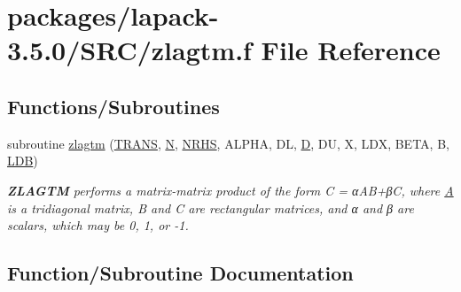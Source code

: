 \hypertarget{zlagtm_8f}{}\section{packages/lapack-\/3.5.0/\+S\+R\+C/zlagtm.f File Reference}
\label{zlagtm_8f}
\subsection*{Functions/\+Subroutines}
\begin{DoxyCompactItemize}
\item 
subroutine \hyperlink{zlagtm_8f_ae43681df271de49fc4fcac3c2287d6b1}{zlagtm} (\hyperlink{superlu__enum__consts_8h_a0c4e17b2d5cea33f9991ccc6a6678d62a1f61e3015bfe0f0c2c3fda4c5a0cdf58}{T\+R\+A\+N\+S}, \hyperlink{polmisc_8c_a0240ac851181b84ac374872dc5434ee4}{N}, \hyperlink{example__user_8c_aa0138da002ce2a90360df2f521eb3198}{N\+R\+H\+S}, A\+L\+P\+H\+A, D\+L, \hyperlink{odrpack_8h_a7dae6ea403d00f3687f24a874e67d139}{D}, D\+U, X, L\+D\+X, B\+E\+T\+A, B, \hyperlink{example__user_8c_a50e90a7104df172b5a89a06c47fcca04}{L\+D\+B})
\begin{DoxyCompactList}\small\item\em {\bfseries Z\+L\+A\+G\+T\+M} performs a matrix-\/matrix product of the form C = α\+A\+B+β\+C, where \hyperlink{classA}{A} is a tridiagonal matrix, B and C are rectangular matrices, and α and β are scalars, which may be 0, 1, or -\/1. \end{DoxyCompactList}\end{DoxyCompactItemize}


\subsection{Function/\+Subroutine Documentation}
\hypertarget{zlagtm_8f_ae43681df271de49fc4fcac3c2287d6b1}{}
